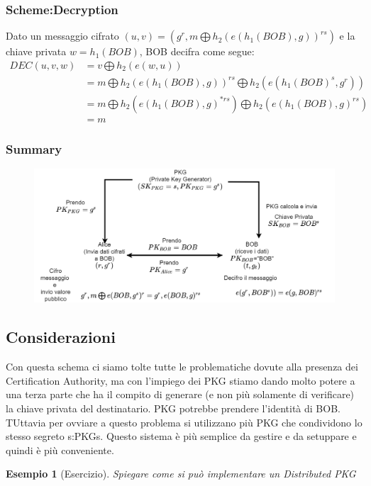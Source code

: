\documentclass{book}
\newtheorem{esempio}{\textcolor{Grey1}{Esempio}}
\begin{document}
\subsubsection{Scheme:Decryption}
Dato un messaggio cifrato \((u,v)=(g^{r},m\bigoplus {h_{2}(e(h_{1}(BOB),g))}^{rs})\) e la chiave privata \(w=h_{1}(BOB)\), BOB decifra come segue:
\begin{align*}
	DEC(u,v,w)&=v\bigoplus h_{2}(e(w,u))\\
	&=m\bigoplus h_{2}{(e(h_{1}(BOB),g))}^{rs}\bigoplus h_{2}(e({h_{1}(BOB)}^{s},g^{r}))\\
	&=m\bigoplus h_{2}({e(h_{1}(BOB),g)}^{*rs})\bigoplus h_{2}({e(h_{1}(BOB),g)}^{rs})\\
	&=m
\end{align*}
\subsubsection{Summary}
\begin{figure}[ht]
	\centering
	\includegraphics[scale=0.36]{ibes1.png}%
\end{figure}
\subsection{Considerazioni}
Con questa schema ci siamo tolte tutte le problematiche dovute alla presenza dei Certification Authority, ma con l'impiego dei PKG stiamo dando molto potere a una terza parte che ha il compito di generare (e non più solamente di verificare) la chiave privata del destinatario. PKG potrebbe prendere l'identità di BOB\@.\newline
TUttavia per ovviare a questo problema si utilizzano più PKG che condividono lo stesso segreto s:\@distributed PKGs. Questo sistema è più semplice da gestire e da setuppare e quindi è più conveniente.
\begin{esempio}[Esercizio]
	Spiegare come si può implementare un Distributed PKG
\end{esempio}
\end{document}
